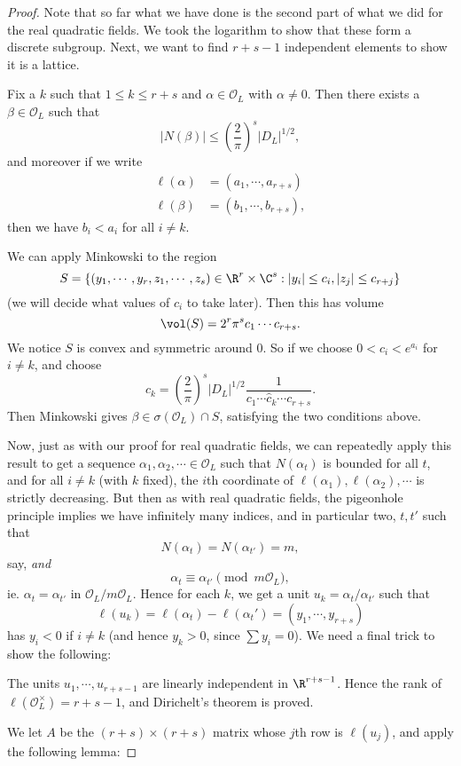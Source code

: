 \documentclass[a4paper]{article}
\begin{document}
\begin{proof}
  Note that so far what we have done is the second part of what we did for the real quadratic fields. We took the logarithm to show that these form a discrete subgroup. Next, we want to find $r + s - 1$ independent elements to show it is a lattice.

  \begin{claim}
    Fix a $k$ such that $1 \leq k \leq r + s$ and $\alpha \in \mathcal{O}_L$ with $\alpha \not= 0$. Then there exists a $\beta \in \mathcal{O}_L$ such that
    \[
      |N(\beta)| \leq \left(\frac{2}{\pi}\right)^s |D_L|^{1/2},
    \]
    and moreover if we write
    \begin{align*}
      \ell(\alpha) &= (a_1, \cdots, a_{r + s})\\
      \ell(\beta) &= (b_1, \cdots, b_{r + s}),
    \end{align*}
    then we have $b_i < a_i$ for all $i \not= k$.
  \end{claim}
  We can apply Minkowski to the region
  \[
    S = \{(y_1, \cdots, y_r, z_1, \cdots, z_s) \in \R^r \times \C^s: |y_i| \leq c_i, |z_j| \leq c_{r + j}\}
  \]
  (we will decide what values of $c_i$ to take later). Then this has volume
  \[
    \vol(S) = 2^r \pi^s c_1 \cdots c_{r + s}.
  \]
  We notice $S$ is convex and symmetric around $0$. So if we choose $0 < c_i < e^{a_i}$ for $i \not= k$, and choose
  \[
    c_k = \left(\frac{2}{\pi}\right)^s |D_L|^{1/2} \frac{1}{c_1 \cdots \hat{c}_k \cdots c_{r + s}}.
  \]
  Then Minkowski gives $\beta \in \sigma(\mathcal{O}_L) \cap S$, satisfying the two conditions above.

  Now, just as with our proof for real quadratic fields, we can repeatedly apply this result to get a sequence $\alpha_1, \alpha_2, \cdots \in \mathcal{O}_L$ such that $N(\alpha_t)$ is bounded for all $t$, and for all $i \not= k$ (with $k$ fixed), the $i$th coordinate of $\ell(\alpha_1), \ell(\alpha_2), \cdots$ is strictly decreasing. But then as with real quadratic fields, the pigeonhole principle implies we have infinitely many indices, and in particular two, $t, t'$ such that
  \[
    N(\alpha_t) = N(\alpha_{t'}) = m,
  \]
  say, \emph{and}
  \[
    \alpha_t \equiv \alpha_{t'} \pmod {m\mathcal{O}_L},
  \]
  ie. $\alpha_t = \alpha_{t'}$ in $\mathcal{O}_L/m\mathcal{O}_L$. Hence for each $k$, we get a unit $u_k = \alpha_t/\alpha_{t'}$ such that
  \[
    \ell(u_k) = \ell(\alpha_t) - \ell(\alpha_t') = (y_1, \cdots, y_{r + s})
  \]
  has $y_i < 0$ if $i \not= k$ (and hence $y_k > 0$, since $\sum y_i = 0$). We need a final trick to show the following:
  \begin{claim}
    The units $u_1, \cdots, u_{r + s - 1}$ are linearly independent in $\R^{r + s - 1}$. Hence the rank of $\ell(\mathcal{O}_L^\times) = r + s - 1$, and Dirichelt's theorem is proved.
  \end{claim}
  We let $A$ be the $(r + s)\times (r + s)$ matrix whose $j$th row is $\ell(u_j)$, and apply the following lemma:


\end{proof}
\end{document}
